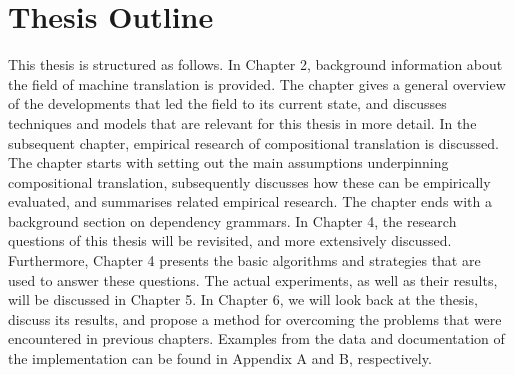 \section*{Thesis Outline}

This thesis is structured as follows. In Chapter 2, background information about the field of machine translation is provided. The chapter gives a general overview of the developments that led the field to its current state, and discusses techniques and models that are relevant for this thesis in more detail. In the subsequent chapter, empirical research of compositional translation is discussed. The chapter starts with setting out the main assumptions underpinning compositional translation, subsequently discusses how these can be empirically evaluated, and summarises related empirical research. The chapter ends with a background section on dependency grammars.
In Chapter 4, the research questions of this thesis will be revisited, and more extensively discussed. Furthermore, Chapter 4 presents the basic algorithms and strategies that are used to answer these questions. The actual experiments, as well as their results, will be discussed in Chapter 5. In Chapter 6, we will look back at the thesis, discuss its results, and propose a method for overcoming the problems that were encountered in previous chapters. Examples from the data and documentation of the implementation can be found in Appendix A and B, respectively.



%
%